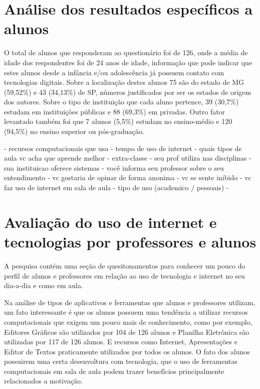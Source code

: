 \section{Análise dos resultados específicos a alunos}

O total de alunos que responderam ao questionário foi de 126, onde a média de idade dos respondentes foi de 24 anos de idade, informação que pode indicar que estes alunos desde a infância e/ou adolescência já possuem contato com tecnologias digitais. Sobre a localização destes alunos 75 são do estado de MG (59,52\%) e 43 (34,13\%) de SP, números justificados por ser os estados de origem dos autores. Sobre o tipo de instituição que cada aluno pertence, 39 (30,7\%) estudam em instituições públicas e 88 (69,3\%) em privadas. Outro fator levantado também foi que 7 alunos (5,5\%) estudam no ensino-médio e 120 (94,5\%) no ensino superior ou pós-graduação.



- recursos computacionais que usa
- tempo de uso de internet
- quais tipos de aula vc acha que aprende melhor
- extra-classe
- seu prof utiliza nas disciplinas
- sua instituicao oferece sistemas
- você informa seu professor sobre o seu entendimento
- vc gostaria de opinar de forma anonima
- vc se sente inibido
- vc faz uso de internet em sala de aula
- tipo de uso (academico / pessoais)
- 

\section{Avaliação do uso de internet e tecnologias por professores e alunos}

A pesquisa contém uma seção de quesitonamentos para conhecer um pouco do perfil de alunos e professores em relação ao uso de tecnologia e internet no seu dia-a-dia e como em aula. 

Na análise de tipos de aplicativos e ferramentas que alunos e professores utilizam, um fato interessante é que os alunos possuem uma tendência a utilizar recursos computacionais que exigem um pouco mais de conhecimento, como por exemplo, Editores Gráficos são utilizados por 104 de 126 alunos e Planilha Eletrônica são utilizadas por 117 de 126 alunos. E recursos como Internet, Apresentações e Editor de Textos praticamente utilizados por todos os alunos. O fato dos alunos possuirem uma certa desenvoltura com tecnologia, que o uso de ferramentas computacionais em sala de aula podem trazer benefícios principalmente relacionados a motivação.

